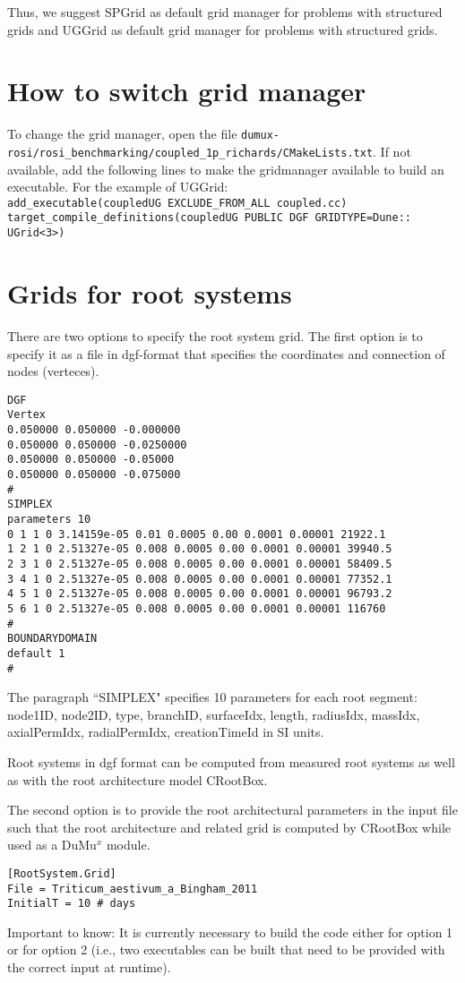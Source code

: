 Thus, we suggest SPGrid as default grid manager for problems with structured grids and UGGrid as default grid manager for problems with structured grids. 

\section*{How to switch grid manager}
To change the grid manager, open the file \lstinline{dumux-rosi/rosi_benchmarking/coupled_1p_richards/CMakeLists.txt}. If not available, add the following lines to make the gridmanager available to build an executable. For the example of UGGrid:\\

\lstinline{add_executable(coupledUG EXCLUDE_FROM_ALL coupled.cc)}\\
\lstinline{target_compile_definitions(coupledUG PUBLIC DGF GRIDTYPE=Dune:: UGrid<3>)}

\section*{Grids for root systems}

There are two options to specify the root system grid. The first option is to specify it as a file in dgf-format that specifies the coordinates and connection of nodes (verteces).  

\begin{lstlisting}
DGF
Vertex
0.050000 0.050000 -0.000000
0.050000 0.050000 -0.0250000
0.050000 0.050000 -0.05000
0.050000 0.050000 -0.075000
#
SIMPLEX 
parameters 10 
0 1 1 0 3.14159e-05 0.01 0.0005 0.00 0.0001 0.00001 21922.1 
1 2 1 0 2.51327e-05 0.008 0.0005 0.00 0.0001 0.00001 39940.5 
2 3 1 0 2.51327e-05 0.008 0.0005 0.00 0.0001 0.00001 58409.5 
3 4 1 0 2.51327e-05 0.008 0.0005 0.00 0.0001 0.00001 77352.1 
4 5 1 0 2.51327e-05 0.008 0.0005 0.00 0.0001 0.00001 96793.2 
5 6 1 0 2.51327e-05 0.008 0.0005 0.00 0.0001 0.00001 116760 
#
BOUNDARYDOMAIN
default 1
#
\end{lstlisting}

The paragraph ``SIMPLEX" specifies 10 parameters for each root segment: node1ID, node2ID, type, branchID, surfaceIdx, length, radiusIdx, massIdx, axialPermIdx, radialPermIdx, creationTimeId in SI units. 

Root systems in dgf format can be computed from measured root systems as well as with the root architecture model CRootBox. 

The second option is to provide the root architectural parameters in the input file such that the root architecture and related grid is computed by CRootBox while used as a DuMu$^x$ module. 

\begin{lstlisting}
[RootSystem.Grid]
File = Triticum_aestivum_a_Bingham_2011  
InitialT = 10 # days
\end{lstlisting}

Important to know: It is currently necessary to build the code either for option 1 or for option 2 (i.e., two executables can be built that need to be provided with the correct input at runtime). 
